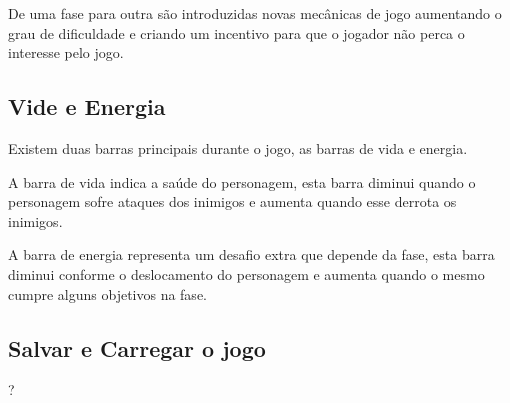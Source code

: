 De uma fase para outra são introduzidas novas mecânicas de jogo aumentando o
 grau de dificuldade e criando um incentivo para que o jogador 
não perca o interesse pelo jogo.

\subsection {Vide e Energia}

Existem duas barras principais durante o jogo, as barras de vida e energia. 

A barra de vida indica a saúde do personagem, esta barra diminui quando
o personagem sofre ataques dos inimigos e aumenta quando esse derrota os
 inimigos.

A barra de energia representa um desafio extra que depende da fase, esta
 barra diminui conforme o deslocamento do personagem e aumenta quando o 
mesmo cumpre alguns objetivos na fase.

\subsection {Salvar e Carregar o jogo}
?